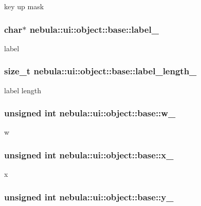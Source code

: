 key up mask \hypertarget{classnebula_1_1ui_1_1object_1_1base_addbea819eadf0212036dfa7d8565f06d}{
\subsubsection[{label\_\-}]{\setlength{\rightskip}{0pt plus 5cm}char$\ast$ {\bf nebula::ui::object::base::label\_\-}}}
\label{classnebula_1_1ui_1_1object_1_1base_addbea819eadf0212036dfa7d8565f06d}


label \hypertarget{classnebula_1_1ui_1_1object_1_1base_a8e12b29537ceda092423078dcd031e3c}{
\subsubsection[{label\_\-length\_\-}]{\setlength{\rightskip}{0pt plus 5cm}size\_\-t {\bf nebula::ui::object::base::label\_\-length\_\-}}}
\label{classnebula_1_1ui_1_1object_1_1base_a8e12b29537ceda092423078dcd031e3c}
label length \hypertarget{classnebula_1_1ui_1_1object_1_1base_a11808daa2f1de6fb4eead60b5471620a}{
\subsubsection[{w\_\-}]{\setlength{\rightskip}{0pt plus 5cm}unsigned int {\bf nebula::ui::object::base::w\_\-}}}
\label{classnebula_1_1ui_1_1object_1_1base_a11808daa2f1de6fb4eead60b5471620a}


w \hypertarget{classnebula_1_1ui_1_1object_1_1base_ae86e01905bfd8aef693daeed01adef19}{
\subsubsection[{x\_\-}]{\setlength{\rightskip}{0pt plus 5cm}unsigned int {\bf nebula::ui::object::base::x\_\-}}}
\label{classnebula_1_1ui_1_1object_1_1base_ae86e01905bfd8aef693daeed01adef19}


x \hypertarget{classnebula_1_1ui_1_1object_1_1base_abadc855d8c507cf94d6518e798e440bc}{
\subsubsection[{y\_\-}]{\setlength{\rightskip}{0pt plus 5cm}unsigned int {\bf nebula::ui::object::base::y\_\-}}}
\label{classnebula_1_1ui_1_1object_1_1base_abadc855d8c507cf94d6518e798e440bc}


